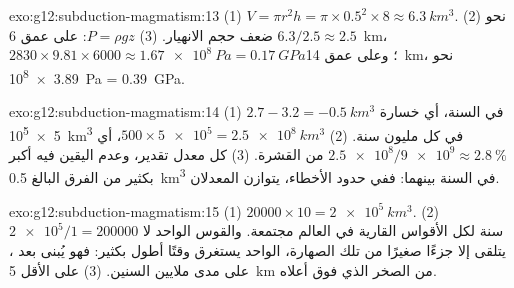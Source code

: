 \begin{solution}{exo:g12:subduction-magmatism:13}
(1) $V = \pi r^2 h = \pi \times 0.5^2 \times 8 \approx \qty{6.3}{km^3}$.
(2) نحو $6.3/2.5 \approx 2.5$ ضعف حجم الانهيار.
(3) $P = \rho g z$: على عمق \qty{6}{km}، $2830 \times 9.81 \times 6000 \approx
\qty{1.67e8}{Pa} = \qty{0.17}{GPa}$؛ وعلى عمق \qty{14}{km}، نحو
\qty{3.89e8}{Pa} = \qty{0.39}{GPa}.
\end{solution}

\begin{solution}{exo:g12:subduction-magmatism:14}
(1) $2.7 - 3.2 = \qty{-0.5}{km^3}$ في السنة، أي خسارة \qty{5e5}{km^3} في كل
مليون سنة. (2) $500 \times \num{5e5} = \qty{2.5e8}{km^3}$، أي
$\num{2.5e8}/\num{9e9} \approx \qty{2.8}{\percent}$ من القشرة. (3) كل
معدل تقدير، وعدم اليقين فيه أكبر بكثير من الفرق البالغ
\qty{0.5}{km^3} في السنة بينهما: ففي حدود الأخطاء، يتوازن المعدلان.
\end{solution}

\begin{solution}{exo:g12:subduction-magmatism:15}
(1) $\num{20000} \times 10 = \qty{2e5}{km^3}$. (2) $\num{2e5}/1 =
\num{200000}$ سنة لكل الأقواس القارية في العالم مجتمعة. والقوس الواحد
لا يتلقى إلا جزءًا صغيرًا من تلك الصهارة،  الواحد يستغرق
وقتًا أطول بكثير: فهو يُبنى  بعد ، على مدى ملايين السنين. (3) على
الأقل \qty{5}{km} من الصخر الذي فوق أعلاه.
\end{solution}

